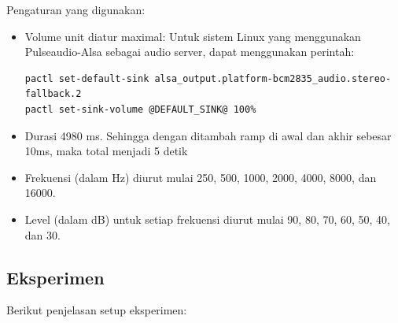 \documentclass[12pt,]{article}
\begin{document}
	Pengaturan yang digunakan:
	\begin{itemize}
		\item Volume unit diatur maximal: Untuk sistem Linux yang menggunakan Pulseaudio-Alsa sebagai audio server, dapat menggunakan perintah:
		\begin{verbatim}
pactl set-default-sink alsa_output.platform-bcm2835_audio.stereo-fallback.2
pactl set-sink-volume @DEFAULT_SINK@ 100%
		\end{verbatim}
		
		\item Durasi 4980 ms. Sehingga dengan ditambah ramp di awal dan akhir sebesar 10ms, maka total menjadi 5 detik
		
		\item Frekuensi (dalam Hz) diurut mulai 250, 500, 1000, 2000, 4000, 8000, dan 16000.
		
		\item Level (dalam dB) untuk setiap frekuensi diurut mulai 90, 80, 70, 60, 50, 40, dan 30.
	\end{itemize}

	\newpage
	\subsection{Eksperimen}
	
	Berikut penjelasan setup eksperimen:
	
\end{document}
